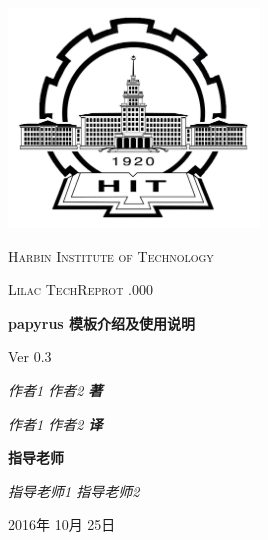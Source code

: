 \documentclass[a4paper,UTF8]{ctexart}
\begin{document}
\newcommand{\pubno}{000}    %
\newcommand{\pubtitle}{papyrus 模板介绍及使用说明\par Ver 0.3 } %
\newcommand{\pubyear}{2016} %
\newcommand{\pubmonth}{10}  %
\newcommand{\pubday}{25}    %

\begin{titlepage}
	\centering
	\par\vspace{5cm}\par
 	\includegraphics[width=0.5\textwidth]{hit_logo}
	\par\vspace{1cm}
	{\scshape\LARGE Harbin Institute of Technology\par}
	\vspace{1cm}
	{\scshape\Large Lilac TechReprot  \textnumero .\pubno\par}
	\vspace{1.5cm}
	{\huge\bfseries \pubtitle \par}
	\vspace{2cm}
	
	{\Large\itshape 作者1 \: 作者2 \quad  \bfseries 著\par}
	{\Large\itshape 作者1 \: 作者2 \quad \bfseries 译\par}
	\vfill
	{\bfseries 指导老师}\par
	{\itshape 指导老师1 \: 指导老师2}

	\vfill
	{\large \pubyear 年 \pubmonth 月 \pubday 日\par}
\end{titlepage}
\end{document}
